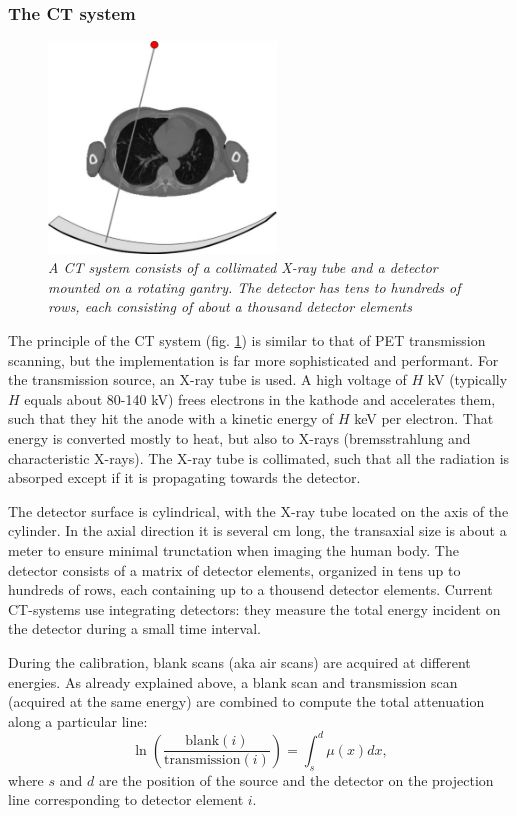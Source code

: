 \documentclass[11pt,oneside]{article}
\begin{document}
\subsubsection{The CT system}
\begin{figure}[tbp]
\centering \includegraphics[width=0.54\textwidth]{figs/fig_ct.pdf} 
\caption{\label{fig:ct} \emph{A CT system consists of a collimated
    X-ray tube and a detector mounted on a rotating gantry. The
    detector has tens to hundreds of rows, each consisting of about a
    thousand detector elements}}
\end{figure}
%
The principle of the CT system (fig. \ref{fig:ct}) is similar to that
of PET transmission scanning, but the implementation is far more
sophisticated and performant. For the transmission source, an X-ray
tube is used. A high voltage of $H$ kV (typically $H$ equals about
80-140 kV) frees electrons in the kathode and accelerates them, such
that they hit the anode with a kinetic energy of $H$ keV per electron.
That energy is converted mostly to heat, but also to X-rays
(bremsstrahlung and characteristic X-rays). The X-ray tube is
collimated, such that all the radiation is absorped except if it is
propagating towards the detector.

The detector surface is cylindrical, with the X-ray tube located on
the axis of the cylinder. In the axial direction it is several cm
long, the transaxial size is about a meter to ensure minimal
trunctation when imaging the human body. The detector consists of a
matrix of detector elements, organized in tens up to hundreds of rows,
each containing up to a thousend detector elements. Current CT-systems
use integrating detectors: they measure the total energy incident on
the detector during a small time interval.

During the calibration, blank scans (aka air scans) are acquired at
different energies. As already explained above, a blank scan and
transmission scan (acquired at the same energy) are combined to
compute the total attenuation along a particular line:
\begin{equation}
  \ln\left(\frac{\mbox{blank}(i)}{\mbox{transmission}(i)}\right) 
     = \int_s^d \mu(x) dx, \label{eq:totatten}
\end{equation}
where $s$ and $d$ are the position of the source and the detector on
the projection line corresponding to detector element $i$.
\end{document}

